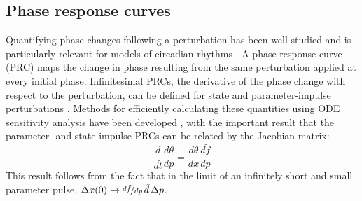 \documentclass[11pt, letterpaper]{article}
\providecommand{\DIFadd}[1]{{\protect\color{blue}\uwave{#1}}} %
\providecommand{\DIFdel}[1]{{\protect\color{red}\sout{#1}}}                      %
\providecommand{\DIFaddbegin}{} %
\providecommand{\DIFaddend}{} %
\providecommand{\DIFdelbegin}{} %
\providecommand{\DIFdelend}{} %
\begin{document}
\subsection*{Phase response curves}
Quantifying phase changes following a perturbation has been well studied and is
particularly relevant for models of circadian rhythms \cite{Kramer1984,
Taylor2008a}. A phase response curve (PRC) maps the change in phase resulting
from the same perturbation applied at \DIFdelbegin \DIFdel{every }\DIFdelend \DIFaddbegin \DIFadd{each }\DIFaddend initial phase. Infinitesimal PRCs,
the derivative of the phase change with respect to the perturbation, can be
defined for state and parameter-impulse perturbations \cite{Taylor2008a}.
Methods for efficiently calculating these quantities using ODE sensitivity
analysis have been developed \cite{Taylor2008a}, with the important result that
the parameter- and state-impulse PRCs can be related by the Jacobian matrix:
\begin{equation}
  \frac{d}{d\tilde{t}}\frac{d\theta}{dp} = \frac{d\theta}{dx}\frac{d\tilde{f}}{dp} 
  \label{eq:pPRCequiv}
\end{equation}
This result follows from the fact that in the limit of an infinitely short and
small parameter pulse, $\Delta x(0) \to \nicefrac{d\tilde{f}}{dp}\,\tilde{d}\,
\Delta p$.
\end{document}
